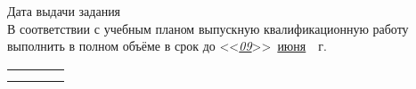 \noindent Дата выдачи задания \TaskStatementDate\\

\noindent В соответствии с учебным планом выпускную квалификационную работу выполнить в полном объёме в срок до <<\underline{\textit{09}}>>~\underline{июня}~\Year~г.

\vspace{30pt}

\noindent \begin{tabular}{p{}>{\raggedleft}p{}p{}P{0.2\textwidth}}
                               \\[5pt]
     \\
\end{tabular}

\vspace{10pt}

